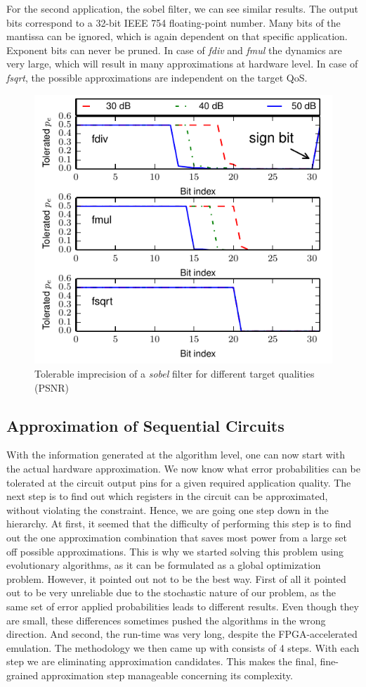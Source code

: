 \documentclass[conference]{IEEEtran}
\begin{document}
For the second application, the sobel filter, we can see similar results. The output bits correspond to a 32-bit IEEE 754 floating-point number. Many bits of the mantissa can be ignored, which is again dependent on that specific application. Exponent bits can never be pruned. In case of \emph{fdiv} and \emph{fmul} the dynamics are very large, which will result in many approximations at hardware level. In case of \emph{fsqrt}, the possible approximations are independent on the target QoS.
\begin{figure}[tb]
  \centering
  \includegraphics[width=.5\textwidth]{figs/metrics_sobel}
  \caption{Tolerable imprecision of a \emph{sobel} filter for different target qualities (PSNR)}
  \label{fig:metrics_sobel}
\end{figure}


\subsection{Approximation of Sequential Circuits}
\label{subsec:approximation}
With the information generated at the algorithm level, one can now start with the actual hardware approximation. We now know what error probabilities can be tolerated at the circuit output pins for a given required application quality. The next step is to find out which registers in the circuit can be approximated, without violating the constraint. Hence, we are going one step down in the hierarchy. At first, it seemed that the difficulty of performing this step is to find out the one approximation combination that saves most power from a large set off possible approximations. This is why we started solving this problem using evolutionary algorithms, as it can be formulated as a global optimization problem. However, it pointed out not to be the best way. First of all it pointed out to be very unreliable due to the stochastic nature of our problem, as the same set of error applied probabilities leads to different results. Even though they are small, these differences sometimes pushed the algorithms in the wrong direction. And second, the run-time was very long, despite the FPGA-accelerated emulation. The methodology we then came up with consists of 4 steps. With each step we are eliminating approximation candidates. This makes the final, fine-grained approximation step manageable concerning its complexity.
\end{document}
